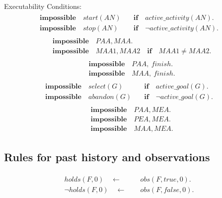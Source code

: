\documentclass[11pt, oneside]{article}
\begin{document}
Executability Conditions:
\begin{align}\begin{split}
\mathbf{impossible}\quad  start(AN)\quad  & \mathbf{if}\quad active\_activity(AN). \\
\mathbf{impossible}\quad  stop(AN)\ \quad  & \mathbf{if}\quad  \neg active\_activity(AN). 
\end{split}\end{align}
\begin{align}\begin{split}
&\mathbf{impossible}\quad  PAA, MAA. \\
&\mathbf{impossible}\quad  MAA1, MAA2\quad \mathbf{if} \quad MAA1\neq MAA2.
\end{split}\end{align}
\begin{align}\begin{split}
&\mathbf{impossible}\quad  PAA, \ finish. \\
&\mathbf{impossible}\quad  MAA, \ finish.
\end{split}\end{align}
\begin{align}\begin{split}
\mathbf{impossible}\quad select(G)\ \ \ \:\quad &\mathbf{if} \quad active\_goal(G). \\
\mathbf{impossible}\quad abandon(G) \quad &\mathbf{if} \quad \neg active\_goal(G). 
\end{split}\end{align}
\begin{align}\begin{split}
&\mathbf{impossible}\quad  PAA, MEA. \\
&\mathbf{impossible}\quad  PEA, MEA. \\
&\mathbf{impossible}\quad  MAA, MEA. 
\end{split}\end{align}

\subsection{Rules for past history and observations}

\begin{align}\begin{split}
holds(F, 0)  \quad \leftarrow \quad\ &obs(F,true,0).\\
\neg holds(F, 0)  \quad \leftarrow \quad\ &obs(F,false,0).
\end{split}\end{align}
\end{document}
